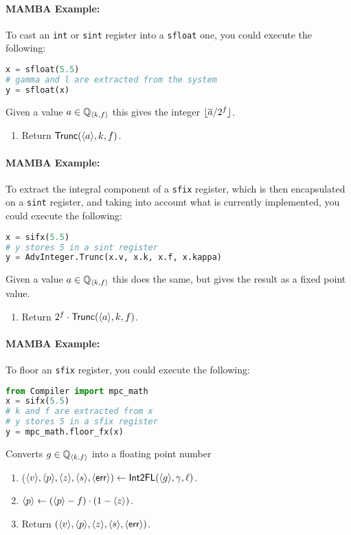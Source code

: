 \paragraph{MAMBA Example:} To cast an \verb|int| or \verb|sint| register into a \verb|sfloat| one, you could execute the following: 
\begin{lstlisting}[language={python}]
x = sfloat(5.5)
# gamma and l are extracted from the system
y = sfloat(x)
\end{lstlisting}


Given a value $a \in {\mathbb{Q}}_{\langle k, f \rangle}$ this gives the integer
${\lfloor \overline{a}/2^f \rfloor}$.
\begin{enumerate}
\item Return $\mathsf{Trunc}(\langle a \rangle,k,f)$.
\end{enumerate}

\paragraph{MAMBA Example:} To extract the integral component of a \verb|sfix| register, which is then encapsulated on a \verb|sint| register, 
and taking into account what is currently implemented, you could execute the following: 
\begin{lstlisting}[language={python}]
x = sifx(5.5)
# y stores 5 in a sint register
y = AdvInteger.Trunc(x.v, x.k, x.f, x.kappa)
\end{lstlisting}
Given a value $a \in {\mathbb{Q}}_{\langle k, f \rangle}$ this does the same, but
gives the result as a fixed point value.
\begin{enumerate}
\item Return $2^f \cdot \mathsf{Trunc}(\langle a \rangle,k,f)$.
\end{enumerate}
\paragraph{MAMBA Example:} To floor an \verb|sfix| register, you could execute the following: 
\begin{lstlisting}[language={python}]
from Compiler import mpc_math
x = sifx(5.5)
# k and f are extracted from x
# y stores 5 in a sfix register
y = mpc_math.floor_fx(x)
\end{lstlisting}

Converts $g \in {\mathbb{Q}}_{\langle k, f \rangle}$ into a floating point number
\begin{enumerate}
\item ($\langle v \rangle,\langle p \rangle,\langle z \rangle,\langle s \rangle,\langle \mathsf{err} \rangle)
	\leftarrow \mathsf{Int2FL}(\langle g \rangle,\gamma,\ell)$.
\item $\langle p \rangle \leftarrow (\langle p \rangle-f) \cdot (1-\langle z \rangle)$.
\item Return $(\langle v \rangle,\langle p \rangle,\langle z \rangle,\langle s \rangle,\langle \mathsf{err} \rangle)$.
\end{enumerate}
